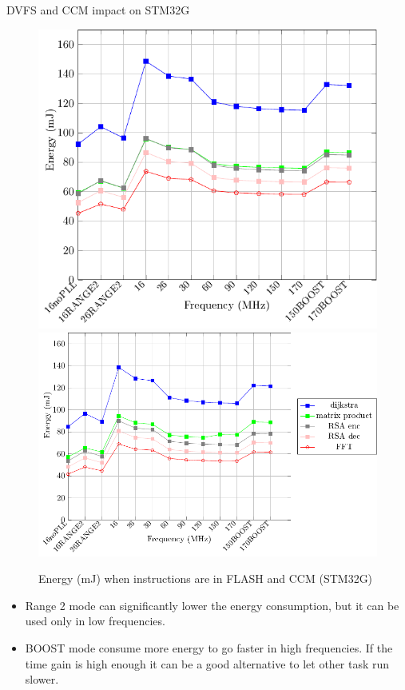 \documentclass[
	11pt, %
]{beamer}
\begin{document}
\begin{frame}{DVFS and CCM impact on STM32G}
	\begin{figure}
		\includegraphics[scale = 0.4]{data/stm32g_v2/abs/abs_energy_flash_32g.pdf}
		\includegraphics[scale = 0.4]{data/stm32g_v2/abs/abs_energy_ccm.pdf}
		\caption{Energy (mJ) when instructions are in FLASH and CCM (STM32G)}
	\end{figure}
	\begin{itemize}
		\item Range 2 mode can significantly lower the energy consumption, but it can be used only in low frequencies.
		\item BOOST mode consume more energy to go faster in high frequencies. If the time gain is high enough it can be a good alternative to let other task run slower. 
	\end{itemize}
\end{frame}
\end{document}
